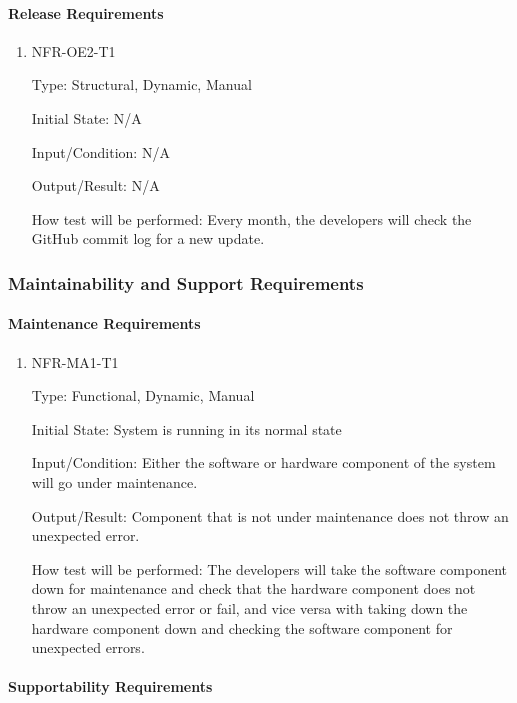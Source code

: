 \documentclass[12pt, titlepage]{article}
\begin{document}
\paragraph{Release Requirements}

\begin{enumerate}
\item{NFR-OE2-T1}

Type: Structural, Dynamic, Manual
					
Initial State: N/A
					
Input/Condition: N/A
					
Output/Result: N/A
					
How test will be performed: Every month, the developers will check the GitHub
commit log for a new update.
\end{enumerate}

\subsubsection{Maintainability and Support Requirements}
\label{sec:5.2.5}
\paragraph{Maintenance Requirements}

\begin{enumerate}

\item{NFR-MA1-T1}

Type: Functional, Dynamic, Manual
					
Initial State: System is running in its normal state
					
Input/Condition: Either the software or hardware component of the system will go
under maintenance.
					
Output/Result: Component that is not under maintenance does not throw an
unexpected error.
					
How test will be performed: The developers will take the software component down
for maintenance and check that the hardware component does not throw an
unexpected error or fail, and vice versa with taking down the hardware component
down and checking the software component for unexpected errors.
					
\end{enumerate}

\paragraph{Supportability Requirements}
\end{document}
